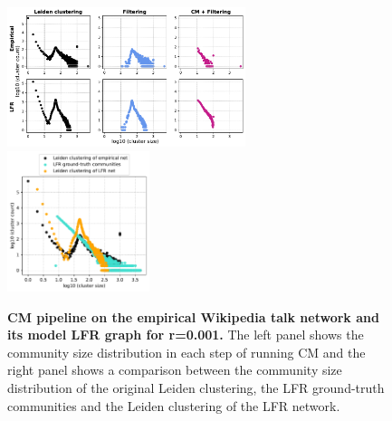 \documentclass[a4paper]{article}   	%
\begin{document}
\begin{figure}[h!]
\centering
\includegraphics[width=0.62\textwidth]{figs/wiki_talk_cm_steps_lfr001.pdf}
\includegraphics[width=0.37\textwidth]{figs/wiki_talk_001_cm_size.pdf}
\caption[CM pipeline on the Wikipedia talk network and its model LFR graph for r=0.001]{\textbf{CM pipeline on the empirical Wikipedia talk network and its model LFR graph for r=0.001.} The left panel shows the community size distribution in each step of running CM and the right panel shows a comparison between the community size distribution of the original Leiden clustering, the LFR ground-truth communities and the Leiden clustering of the LFR network.}
\label{fig:wikitalk-cm-lfr-001}
\end{figure}
\end{document}
